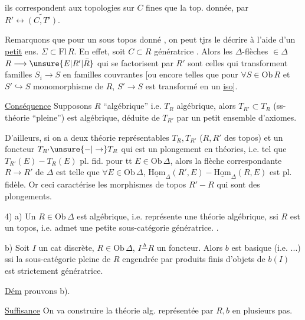 
ils correspondent aux topologies  sur $C$  fines que la top. donnée, par $R'\longleftrightarrow\widetilde{(C,T')}$.

Remarquons que pour un sous topos donné , on peut tjrs le décrire à l'aide d'un \uline{petit} ens. $\Sigma\subset\mathrm{Fl}\,R$. En effet, soit $C\subset R$  génératrice . Alors les $\Delta$-flèches $\in\Delta$ $R\longrightarrow\unsure{E|R'|\bar R}$ qui se factorisent par $R'$ sont celles qui transforment familles  $S_i\to S$   en familles couvrantes [ou encore telles que pour $\forall S\in\mathrm{Ob}\,R$ et $S'\hookrightarrow S$ monomorphisme de  $R$, $S'\to S$ est transformé en un \uline{iso}].

\uline{Conséquence} Supposons $R$ ``algébrique'' i.e. $T_R$  algébrique, alors $T_{R'}\subset T_R$ (ss-théorie ``pleine'') est algébrique, déduite de $T_{R'}$ par un petit ensemble d'axiomes.

D'ailleurs, si on a deux théorie représentables $T_R,T_{R'}$ ($R,R'$ des topos) et un foncteur $T_{R'}\unsure{-|\to} T_R$ qui est un plongement en théories, i.e. tel que  $T_{R'}(E)-T_R(E)$ pl. fid. pour tt $E\in\mathrm{Ob}\,\Delta$,  alors la flèche correspondante $R\to R'$ de $\Delta$ est telle que $\forall E\in\mathrm{Ob}\,\Delta$, $\underline{\mathrm{Hom}}_\Delta(R',E)-\underline{\mathrm{Hom}}_\Delta(R,E)$ est pl. fidèle. Or ceci caractérise les morphismes de topos $R'-R$ qui sont des plongements.

4) \uline{} a) Un $R\in\mathrm{Ob}\,\Delta$ est algébrique, i.e. représente une théorie algébrique, ssi $R$ est un topos, i.e. admet une petite sous-catégorie génératrice. .

b) Soit $I$ un cat discrète, $R\in\mathrm{Ob}\,\Delta$, $I\overset b{-} R$ un foncteur. Alors \unsure{$*$} $b$ est basique (i.e. ...)  ssi la sous-catégorie pleine de $R$ engendrée par produits finis d'objets de $b(I)$ est strictement génératrice.

\uline{Dém}   prouvons  b).

\uline{Suffisance} On va construire la théorie alg.  représentée par $R,b$ en plusieurs pas.

